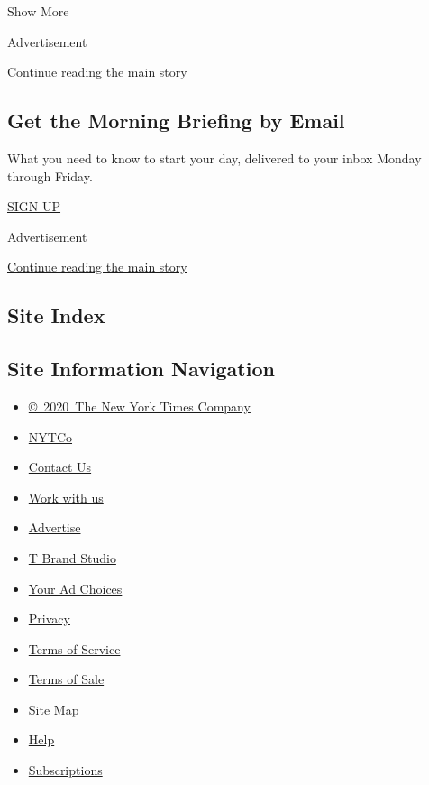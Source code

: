 Show More

Advertisement

\protect\hyperlink{after-mid1}{Continue reading the main story}

\hypertarget{get-the-morning-briefing-by-email}{%
\subsection{Get the Morning Briefing by
Email}\label{get-the-morning-briefing-by-email}}

What you need to know to start your day, delivered to your inbox Monday
through Friday.

\href{https://www.nytimes.com/interactive/2018/briefing/global-morning-briefing-newsletter-signup.html}{SIGN
UP}

Advertisement

\protect\hyperlink{after-mktg}{Continue reading the main story}

\hypertarget{site-index}{%
\subsection{Site Index}\label{site-index}}

\hypertarget{site-information-navigation}{%
\subsection{Site Information
Navigation}\label{site-information-navigation}}

\begin{itemize}
\tightlist
\item
  \href{https://help.nytimes.com/hc/en-us/articles/115014792127-Copyright-notice}{©~2020~The
  New York Times Company}
\end{itemize}

\begin{itemize}
\tightlist
\item
  \href{https://www.nytco.com/}{NYTCo}
\item
  \href{https://help.nytimes.com/hc/en-us/articles/115015385887-Contact-Us}{Contact
  Us}
\item
  \href{https://www.nytco.com/careers/}{Work with us}
\item
  \href{https://nytmediakit.com/}{Advertise}
\item
  \href{http://www.tbrandstudio.com/}{T Brand Studio}
\item
  \href{https://www.nytimes.com/privacy/cookie-policy\#how-do-i-manage-trackers}{Your
  Ad Choices}
\item
  \href{https://www.nytimes.com/privacy}{Privacy}
\item
  \href{https://help.nytimes.com/hc/en-us/articles/115014893428-Terms-of-service}{Terms
  of Service}
\item
  \href{https://help.nytimes.com/hc/en-us/articles/115014893968-Terms-of-sale}{Terms
  of Sale}
\item
  \href{https://spiderbites.nytimes.com}{Site Map}
\item
  \href{https://help.nytimes.com/hc/en-us}{Help}
\item
  \href{https://www.nytimes.com/subscription?campaignId=37WXW}{Subscriptions}
\end{itemize}
